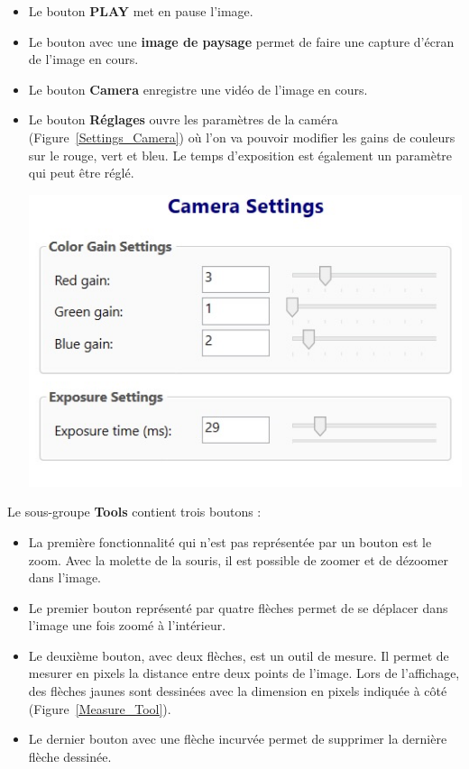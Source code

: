 \begin{itemize}[label=\textbullet]
    \item Le bouton \textbf{PLAY} met en pause l'image.
    \item Le bouton avec une \textbf{image de paysage} permet de faire une capture d'écran de l'image en cours.
    \item Le bouton \textbf{Camera} enregistre une vidéo de l'image en cours.
    \item
          \begin{minipage}{0.4\textwidth}
              Le bouton \textbf{Réglages} ouvre les paramètres de la caméra (Figure~\ref{Settings_Camera}) où l'on va pouvoir modifier les gains de couleurs sur le rouge, vert et bleu. Le temps d'exposition est également un paramètre qui peut être réglé.
          \end{minipage}
          \hfill
          \begin{minipage}{0.55\textwidth}
              \centering
              \includegraphics[width=\textwidth]{assets/figures/Application_ServoVision/Settings_Camera.png}
              \label{Settings_Camera}
          \end{minipage}
\end{itemize}
Le sous-groupe \textbf{Tools} contient trois boutons :
\begin{itemize}[label=\textbullet]
    \item La première fonctionnalité qui n'est pas représentée par un bouton est le zoom. Avec la molette de la souris, il est possible de zoomer et de dézoomer dans l'image.
    \item Le premier bouton représenté par quatre flèches permet de se déplacer dans l'image une fois zoomé à l'intérieur.
    \item Le deuxième bouton, avec deux flèches, est un outil de mesure. Il permet de mesurer en pixels la distance entre deux points de l'image. Lors de l'affichage, des flèches jaunes sont dessinées avec la dimension en pixels indiquée à côté (Figure~\ref{Measure_Tool}).
    \item Le dernier bouton avec une flèche incurvée permet de supprimer la dernière flèche dessinée.
\end{itemize}

